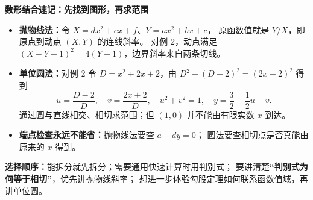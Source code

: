 \begin{summarybox}
\textbf{\textcolor{CSummary}{数形结合速记：先找到图形，再求范围}}
  \begin{itemize}[leftmargin=*,itemsep=0.4em]
    \item \textbf{抛物线法：}令 $X=dx^2+ex+f$、$Y=ax^2+bx+c$，
      原函数值就是 $Y/X$，即原点到动点 $(X,Y)$ 的连线斜率。
      对例 2，动点满足 $(X-Y-1)^2=4(Y-1)$，边界斜率来自两条切线。
    \item \textbf{单位圆法：}对例 2 令 $D=x^2+2x+2$，由
      $D^2-(D-2)^2=(2x+2)^2$ 得到
      \[
        u=\frac{D-2}{D},\quad v=\frac{2x+2}{D},\quad
        u^2+v^2=1,\quad y=\frac32-\frac12u-v.
      \]
      通过圆与直线相交、相切求范围；但 $(1,0)$ 并不能由有限实数 $x$ 到达。
    \item \textbf{端点检查永远不能省：}抛物线法要查 $a-dy=0$；
      圆法要查相切点是否真能由原来的 $x$ 得到。
  \end{itemize}

  \textbf{选择顺序：}能拆分就先拆分；需要通用快速计算时用判别式；
  要讲清楚\textbf{“判别式为何等于相切”}，优先讲抛物线斜率；
  想进一步体验勾股定理如何联系函数值域，再讲单位圆。
\end{summarybox}

